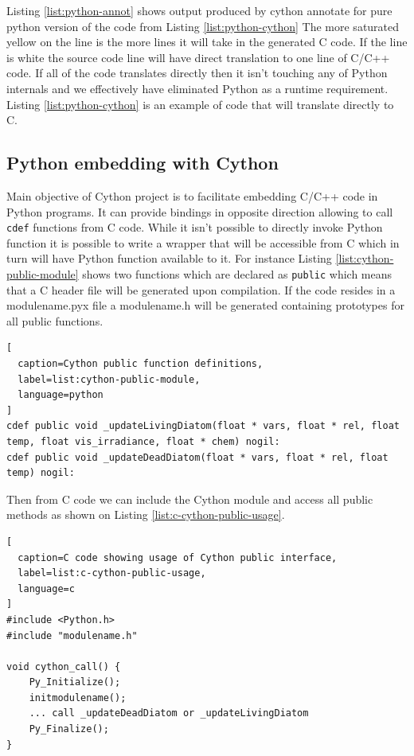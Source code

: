\documentclass[12pt, a4paper]{report}
\begin{document}
Listing \ref{list:python-annot} shows output produced by cython annotate
for pure python version of the code from Listing \ref{list:python-cython}
The more saturated yellow on the line is the more lines it will take in
the generated C code. If the line is white the source code line will have
direct translation to one line of C/C++ code. If all of the code translates
directly then it isn't touching any of Python internals and we effectively
have eliminated Python as a runtime requirement. Listing \ref{list:python-cython}
is an example of code that will translate directly to C.

\subsection{Python embedding with Cython}\label{sec:embed-cython}

Main objective of Cython project is to facilitate embedding C/C++ code in
Python programs. It can provide bindings in opposite direction allowing
to call \lstinline{cdef} functions from C code. While it isn't possible
to directly invoke Python function it is possible to write a wrapper
that will be accessible from C which in turn will have Python function
available to it. For instance Listing \ref{list:cython-public-module}
shows two functions which are declared as \lstinline{public} which means
that a C header file will be generated upon compilation. If the code
resides in a modulename.pyx file a modulename.h will be generated containing
prototypes for all public functions.

\begin{lstlisting}[
  caption=Cython public function definitions,
  label=list:cython-public-module,
  language=python
]
cdef public void _updateLivingDiatom(float * vars, float * rel, float temp, float vis_irradiance, float * chem) nogil:
cdef public void _updateDeadDiatom(float * vars, float * rel, float temp) nogil:
\end{lstlisting}

Then from C code we can include the Cython module and access all public methods as
shown on Listing \ref{list:c-cython-public-usage}.

\begin{lstlisting}[
  caption=C code showing usage of Cython public interface,
  label=list:c-cython-public-usage,
  language=c
]
#include <Python.h>
#include "modulename.h"

void cython_call() {
    Py_Initialize();
    initmodulename();
    ... call _updateDeadDiatom or _updateLivingDiatom
    Py_Finalize();
}\end{lstlisting}
\end{document}

